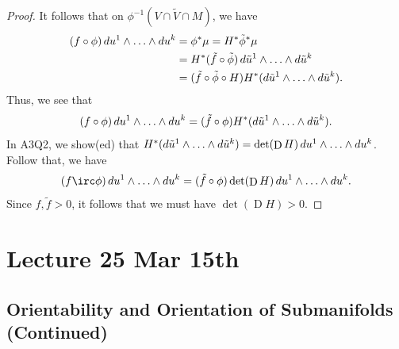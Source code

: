 \documentclass[notoc,notitlepage]{tufte-book}
\DeclareMathOperator{\D}{D}
\begin{document}
\begin{proof}
  It follows that on $\phi^{-1}(V \cap \tilde{V} \cap M)$, we have
  \begin{align*}
    (f \circ \phi)\mathop{}\!d{u^1} \land \hdots \land \mathop{}\!d{u^k}
    &= \phi^* \mu = H^* \tilde{\phi}^* \mu \\
    &= H^*(\tilde{f} \circ \tilde{\phi})\mathop{}\!d{\tilde{u}^1} \land \hdots \land
    \mathop{}\!d{\tilde{u}^k} \\
    &= (\tilde{f} \circ \tilde{\phi} \circ H) H^* (\mathop{}\!d{\tilde{u}^1} \land
    \hdots \land \mathop{}\!d{\tilde{u}^k}).
  \end{align*}
  Thus, we see that
  \begin{equation*}
    (f \circ \phi)\mathop{}\!d{u^1} \land \hdots \land \mathop{}\!d{u^k} = (\tilde{f} \circ
    \phi)H^*(\mathop{}\!d{\tilde{u}^1} \land \hdots \land \mathop{}\!d{\tilde{u}^k}).
  \end{equation*}
  In A3Q2, we show(ed) that $H^*(\dif{\tilde{u}^1} \land \hdots \land
  \dif{\tilde{u}^k}) = \det (\D H) \dif{u^1} \land \hdots \land \dif{u^k}$.
  Follow that, we have
  \begin{equation*}
    (f \irc \phi) \dif{u^1} \land \hdots \land \dif{u^k} = (\tilde{f} \circ
    \phi) \det(\D H) \dif{u^1} \land \hdots \land \dif{u^k}.
  \end{equation*}
  Since $f, \tilde{f} > 0$, it follows that we must have $\det(\D H) > 0$.
\end{proof}



\chapter{Lecture 25 Mar 15th}%
\label{chp:lecture_25_mar_15th}

\section{Orientability and Orientation of Submanifolds (Continued)}%
\label{sec:orientability_and_orientation_of_submanifolds_continued}
\end{document}
